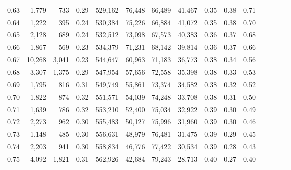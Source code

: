\begin{tabular}{rrrcrrrrrrrrrrr}
0.63 &   1,779 &    733 &                                       0.29 &  529,162 &   76,448 &   66,489 &   41,467 &  0.35 &  0.38 &                         0.71 \\
0.64 &   1,222 &    395 &                                       0.24 &  530,384 &   75,226 &   66,884 &   41,072 &  0.35 &  0.38 &                         0.70 \\
0.65 &   2,128 &    689 &                                       0.24 &  532,512 &   73,098 &   67,573 &   40,383 &  0.36 &  0.37 &                         0.68 \\
0.66 &   1,867 &    569 &                                       0.23 &  534,379 &   71,231 &   68,142 &   39,814 &  0.36 &  0.37 &                         0.66 \\
0.67 &  10,268 &  3,041 &                                       0.23 &  544,647 &   60,963 &   71,183 &   36,773 &  0.38 &  0.34 &                         0.56 \\
0.68 &   3,307 &  1,375 &                                       0.29 &  547,954 &   57,656 &   72,558 &   35,398 &  0.38 &  0.33 &                         0.53 \\
0.69 &   1,795 &    816 &                                       0.31 &  549,749 &   55,861 &   73,374 &   34,582 &  0.38 &  0.32 &                         0.52 \\
0.70 &   1,822 &    874 &                                       0.32 &  551,571 &   54,039 &   74,248 &   33,708 &  0.38 &  0.31 &                         0.50 \\
0.71 &   1,639 &    786 &                                       0.32 &  553,210 &   52,400 &   75,034 &   32,922 &  0.39 &  0.30 &                         0.49 \\
0.72 &   2,273 &    962 &                                       0.30 &  555,483 &   50,127 &   75,996 &   31,960 &  0.39 &  0.30 &                         0.46 \\
0.73 &   1,148 &    485 &                                       0.30 &  556,631 &   48,979 &   76,481 &   31,475 &  0.39 &  0.29 &                         0.45 \\
0.74 &   2,203 &    941 &                                       0.30 &  558,834 &   46,776 &   77,422 &   30,534 &  0.39 &  0.28 &                         0.43 \\
0.75 &   4,092 &  1,821 &                                       0.31 &  562,926 &   42,684 &   79,243 &   28,713 &  0.40 &  0.27 &                         0.40 \\

\end{tabular}
